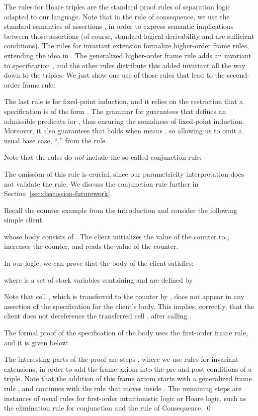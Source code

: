 \documentclass{LMCS}
\begin{document}
The rules for Hoare triples are the standard proof rules
of separation logic adapted to our language. Note that in 
the rule of consequence, we use the standard
semantics of assertions ,
in order to express semantic implications between those assertions
(of course, standard logical derivability
 and
 are
sufficient conditions).
The rules for invariant extension 
formalize higher-order frame rules,
extending the idea in \cite{birkedal-torpsmith-yang-lics05}.  The generalized higher-order 
frame rule  adds
an invariant  to specification , and the other
rules distribute this added invariant all the way down to
the triples. 
We just show one use of those rules that lead
to the second-order frame rule: 
{

}
The last rule is for fixed-point induction,
and it relies on the restriction that
a specification is of the form . 
The grammar for  guarantees
that  defines an admissible predicate for ,
thus ensuring the soundness of fixed-point induction.
Moreover, it also guarantees that  holds 
when  means , so allowing us to
omit a usual base case, ``,'' from the rule. 

Note that the rules do \emph{not} include the so-called 
conjunction rule:

The omission of this rule is crucial, since
our parametricity interpretation does not validate
the rule. 
We discuss the conjunction rule further
in Section~\ref{sec:discussion-futurework}.

\begin{exa}\label{exa:client-counter}
Recall the counter example from the introduction and
consider the following simple client

whose body consists of .
The client initializes the value of the counter to ,
increases the counter, and reads the value of the counter.

In our logic, we can prove that the body of the client satisfies:

where  is a set of stack variables containing
 and  are defined by

Note that cell , which is transferred to the counter by ,
does not appear in any assertion of the specification for
the client's body. This implies, 
correctly, that the client does not dereference
the transferred cell , after calling .

The formal proof of the specification of the body
uses the first-order frame rule, and it is given below:

The interesting parts of the proof are steps ,
where we use rules for invariant extensions, in order
to add the frame axiom  into the pre
and post conditions of a triple. Note that
the addition of this frame axiom starts with a generalized
frame rule ,
and continues with the rule that moves  inside .
The remaining steps  are instances of
 usual rules for first-order intuitionistic logic
or Hoare logic, such as the
elimination rule for conjunction
and the rule of Consequence.
\qed
\end{exa}
\end{document}
